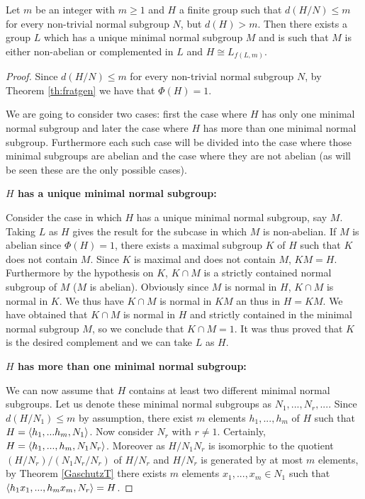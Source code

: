 \begin{theorem}
    Let $m$ be an integer with $m \ge 1$ and $H$ a finite group such that $d(H/N) \le m$ for every non-trivial normal subgroup $N$, but $d(H) > m$. Then there exists a group $L$ which has a unique minimal normal subgroup $M$ and is such that $M$ is either non-abelian or complemented in $L$ and $H \cong L_{f(L,m)}$.
\end{theorem}
\begin{proof}
    Since $d(H/N) \le m$ for every non-trivial normal subgroup $N$, by Theorem \ref{th:fratgen} we have that $\Phi(H) = 1$.
    
    We are going to consider two cases: first the case where $H$ has only one minimal normal subgroup and later the case where $H$ has more than one minimal normal subgroup. Furthermore each such case will be divided into the case where those minimal subgroups are abelian and the case where they are not abelian (as will be seen these are the only possible cases).

    \vspace{\baselineskip}
    \noindent
    \textbf{$H$ has a unique minimal normal subgroup:}
    \vspace{\baselineskip}

    Consider the case in which $H$ has a unique minimal normal subgroup, say $M$. 
    Taking $L$ as $H$ gives the result for the subcase in which $M$ is non-abelian.
    If $M$ is abelian since $\Phi(H) = 1$, there exists a maximal subgroup $K$ of $H$ such that $K$ does not contain $M$. 
    Since $K$ is maximal and does not contain $M$, $KM = H$. 
    Furthermore by the hypothesis on $K$, $K \cap M$ is a strictly contained normal subgroup of $M$ ($M$ is abelian). Obviously since $M$ is normal in $H$, $K \cap M$ is normal in $K$. We thus have $K \cap M$ is normal in $KM$ an thus in $H=KM$. We have obtained that $K \cap M$ is normal in $H$ and strictly contained in the minimal normal subgroup $M$, so we conclude that $K \cap M = 1$. It was thus proved that $K$ is the desired complement and we can take $L$ as $H$.   

    \vspace{\baselineskip}
    \noindent
    \textbf{$H$ has more than one minimal normal subgroup:}
    \vspace{\baselineskip}

    We can now assume that $H$ contains at least two different minimal normal subgroups. 
    Let us denote these minimal normal subgroups as $N_1, ...,N_r, ...$. 
    Since $d(H/N_1) \le m$ by assumption, there exist $m$ elements $h_1,...,h_m$ of $H$ such that $H = \langle h_1,...h_m, N_1 \rangle$. Now consider $N_r$ with $r \ne 1$. Certainly, $H = \langle h_1,...,h_m,N_1N_r \rangle$. Moreover as $H/N_1N_r$ is isomorphic to the quotient $(H/N_r)/(N_1N_r/N_r)$ of $H/N_r$ and $H/N_r$ is generated by at most $m$ elements, by Theorem \ref{GaschutzT} there exists $m$ elements $x_1,...,x_m \in N_1$ such that $\langle h_1x_1,...,h_mx_m,N_r \rangle = H$.


\end{proof}
